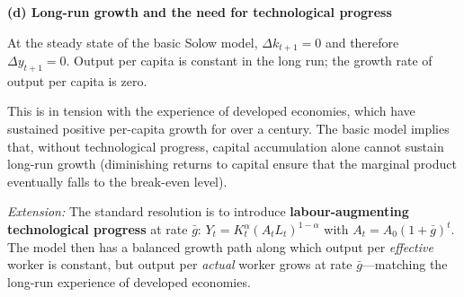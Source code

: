 \documentclass[12pt]{article}
\newenvironment{soln}{%
  \begin{tcolorbox}[
    breakable,
    colback=blue!4!white,
    colframe=blue!50!black,
    title={\textbf{Solution}},
    fonttitle=\small,
    left=4pt, right=4pt, top=4pt, bottom=4pt
  ]
}{%
  \end{tcolorbox}
}
\begin{document}
\begin{soln}
\textbf{(d) Long-run growth and the need for technological progress}

At the steady state of the basic Solow model, $\Delta k_{t+1} = 0$ and
therefore $\Delta y_{t+1} = 0$.  Output per capita is constant in the long
run; the growth rate of output per capita is zero.

This is in tension with the experience of developed economies, which have
sustained positive per-capita growth for over a century.  The basic model
implies that, without technological progress, capital accumulation alone
cannot sustain long-run growth (diminishing returns to capital ensure that
the marginal product eventually falls to the break-even level).

\textit{Extension:} The standard resolution is to introduce \textbf{labour-augmenting
technological progress} at rate $\bar{g}$: $Y_t = K_t^\alpha (A_t L_t)^{1-\alpha}$
with $A_t = A_0(1+\bar{g})^t$.  The model then has a balanced growth path
along which output per \emph{effective} worker is constant, but output per
\emph{actual} worker grows at rate $\bar{g}$---matching the long-run
experience of developed economies.
\end{soln}
\end{document}
